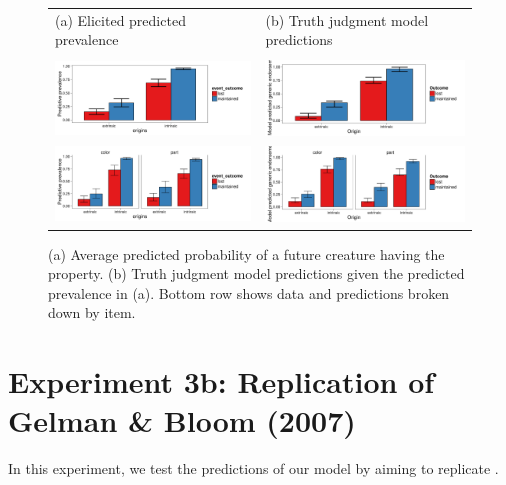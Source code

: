 \documentclass[12pt,letterpaper]{article}
\begin{document}
\begin{figure}
\begin{tabular}{l l}
(a) Elicited predicted prevalence & (b) Truth judgment model predictions\\
\\
\centering
    \includegraphics[width=0.5\columnwidth]{dobles-predictive.pdf} &
    \includegraphics[width=0.5\columnwidth]{dobles-model.pdf} \\
    \includegraphics[width=0.5\columnwidth]{dobles-predictive-byItem.pdf} &
      \includegraphics[width=0.5\columnwidth]{dobles-model-byItem.pdf} \\
\end{tabular}
    \caption{
    (a) Average predicted probability of a future creature having the property. (b) Truth judgment model predictions given the predicted prevalence in (a).
    Bottom row shows data and predictions broken down by item.
  }
  \label{fig:dobles-predictive}
\end{figure}

\section*{Experiment 3b: Replication of Gelman \& Bloom (2007)}

In this experiment, we test the predictions of our model by aiming to replicate .
\end{document}
